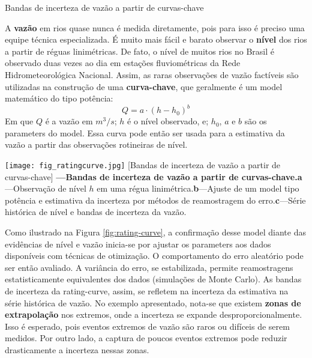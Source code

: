 \documentclass[./main.tex]{subfiles}
\begin{document}
\begin{simplebox}[
    float=htb,
    label={destaque_curvas_chave},
    nameref={Curvas-chave}
    ]{Bandas de incerteza de vazão a partir de curvas-chave}
    \footnotesize
    \begin{minipage}[t]{\linewidth}    
    \par A \textbf{vazão} em rios quase nunca é medida diretamente, pois para isso é preciso uma equipe técnica especializada. É muito mais fácil e barato observar o \textbf{nível} dos rios a partir de réguas linimétricas. De fato, o nível de muitos rios no Brasil é observado duas vezes ao dia em estações fluviométricas da Rede Hidrometeorológica Nacional. Assim, as raras observações de vazão factíveis são utilizadas na construção de uma \textbf{curva-chave}, que geralmente é um \gls{model} matemático do tipo potência:
    \begin{equation*} %
    		\label{eq:rating_curve}
    		Q = a \cdot (h - h_0)^b
    \end{equation*}
    Em que $Q$ é a vazão em $m^{3}/s$; $h$ é o nível observado, e; $h_0$, $a$ e $b$ são os \gls{parameters} do \gls{model}. Essa curva pode então ser usada para a estimativa da vazão a partir das observações rotineiras de nível. 
    \end{minipage}
    \begin{minipage}[t]{\linewidth}
        \begin{minipage}[t]{\linewidth}
        \vspace*{5pt}
        	\texttt{[image: fig\_ratingcurve.jpg]}		
        	[Bandas de incerteza de vazão a partir de curvas-chave]{
                \textbf{---\;Bandas de incerteza de vazão a partir de curvas-chave.}\;\textbf{a}\;---\;Observação de nível $h$ em uma régua linimétrica.\;\textbf{b}\;---\;Ajuste de um \gls{model} tipo potência e estimativa da incerteza por métodos de reamostragem do erro.\;\textbf{c}\;---\;Série histórica de nível e bandas de incerteza da vazão.
        	}
            \label{fig:rating-curve}  %
        \vspace*{5pt}
    \end{minipage}
    \end{minipage}
    \begin{minipage}[t]{\linewidth}
    \par Como ilustrado na Figura \ref{fig:rating-curve}, a confirmação desse \gls{model} diante das evidências de nível e vazão inicia-se por ajustar os \gls{parameters} aos dados disponíveis com técnicas de otimização. O comportamento do erro aleatório pode ser então avaliado. A variância do erro, se estabilizada, permite reamostragens estatisticamente equivalentes dos dados (simulações de Monte Carlo). As bandas de incerteza da \gls{rating-curve}, assim, se refletem na incerteza da estimativa na série histórica de vazão. No exemplo apresentado, nota-se que existem \textbf{zonas de extrapolação} nos extremos, onde a incerteza se expande desproporcionalmente. Isso é esperado, pois eventos extremos de vazão são raros ou difíceis de serem medidos. Por outro lado, a captura de poucos eventos extremos pode reduzir drasticamente a incerteza nessas zonas. 

\end{minipage}
\end{simplebox}
\end{document}

